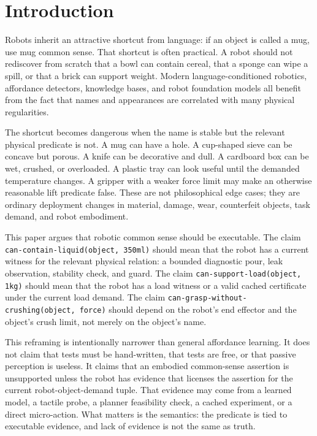 \documentclass{article}
\begin{document}
\section{Introduction}

Robots inherit an attractive shortcut from language: if an object is called a
mug, use mug common sense.  That shortcut is often practical.  A robot should
not rediscover from scratch that a bowl can contain cereal, that a sponge can
wipe a spill, or that a brick can support weight.  Modern language-conditioned
robotics, affordance detectors, knowledge bases, and robot foundation models
all benefit from the fact that names and appearances are correlated with many
physical regularities.

The shortcut becomes dangerous when the name is stable but the relevant
physical predicate is not.  A mug can have a hole.  A cup-shaped sieve can be
concave but porous.  A knife can be decorative and dull.  A cardboard box can be
wet, crushed, or overloaded.  A plastic tray can look useful until the demanded
temperature changes.  A gripper with a weaker force limit may make an otherwise
reasonable lift predicate false.  These are not philosophical edge cases; they
are ordinary deployment changes in material, damage, wear, counterfeit objects,
task demand, and robot embodiment.

This paper argues that robotic common sense should be executable.  The claim
\texttt{can-contain-liquid(object, 350ml)} should mean that the robot has a
current witness for the relevant physical relation: a bounded diagnostic pour,
leak observation, stability check, and guard.  The claim
\texttt{can-support-load(object, 1kg)} should mean that the robot has a load
witness or a valid cached certificate under the current load demand.  The claim
\texttt{can-grasp-without-crushing(object, force)} should depend on the robot's
end effector and the object's crush limit, not merely on the object's name.

This reframing is intentionally narrower than general affordance learning.  It
does not claim that tests must be hand-written, that tests are free, or that
passive perception is useless.  It claims that an embodied common-sense
assertion is unsupported unless the robot has evidence that licenses the
assertion for the current robot-object-demand tuple.  That evidence may come
from a learned model, a tactile probe, a planner feasibility check, a cached
experiment, or a direct micro-action.  What matters is the semantics: the
predicate is tied to executable evidence, and lack of evidence is not the same
as truth.
\end{document}
